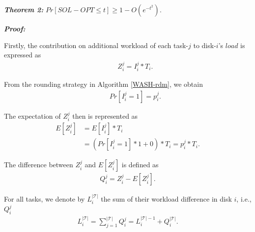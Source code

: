 \documentclass[conference]{IEEEtran}
\begin{document}
\vspace{0.2cm}
\emph{\textbf{Theorem 2:}} $Pr[SOL - OPT\leq t] \geq 1 - O(e^{-t^2})$.

\emph{\textbf{Proof:}}

Firstly, the contribution on additional workload of each task-$j$ to disk-$i$'s $load$ is expressed as
\vspace{-0.2cm}
 \begin{align}
&\;\;\;\;\;Z_i^j = I_i^j*T_i.
\end{align}

\vspace{-0.2cm}
From the rounding strategy in Algorithm \ref{WASH-rdm}, we obtain
 \vspace{-0.2cm}
 \begin{align}
&\;\;\;\;\;Pr[I_i^j = 1] = p_i^j. \nonumber
\end{align}

\vspace{-0.2cm}
The expectation of $Z_i^j$ then is represented as
\vspace{-0.2cm}
\begin{align}
E[Z_i^j] &= E[I_i^j]*T_i \nonumber\\
&= (Pr[I_i^j = 1] * 1 +  0)*T_i = p_i^j*T_i.\label{prove:expect}
\end{align}

\vspace{-0.2cm}
The difference between $Z_i^j$ and $E[Z_i^j]$ is defined as
 \vspace{-0.1cm}
\begin{align}
Q_i^j = Z_i^j - E[Z_i^j].\label{prove:diff}
\end{align}

\vspace{-0.2cm}
For all tasks, we denote by $L_i^{\mathcal{|T|}}$ the sum of their workload difference in disk $i$, i.e., $Q_i^j$ 
 \vspace{-0.1cm}
\begin{align}
L_i^{\mathcal{|T|}} = \sum\nolimits_{j = 1}^{\mathcal{|T|}} Q_i^j
=  L_i^{\mathcal{|T|} - 1} + Q_i^{\mathcal{|T|}}. \label{prove:L_margin}
\end{align}
\end{document}
